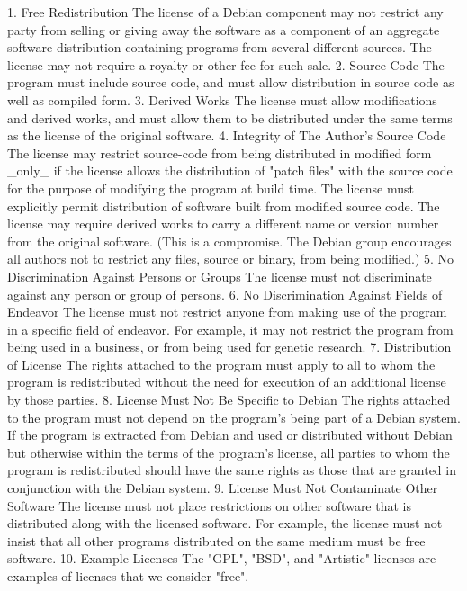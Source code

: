 \documentclass[mingoth,a4paper]{jsarticle}
\begin{document}
{{{\begin{commandline}
    1. Free Redistribution
       The license of a Debian component may not restrict any party from
       selling or giving away the software as a component of an aggregate
       software distribution containing programs from several different
       sources. The license may not require a royalty or other fee for
       such sale.
    2. Source Code
       The program must include source code, and must allow distribution
       in source code as well as compiled form.
    3. Derived Works
       The license must allow modifications and derived works, and must
       allow them to be distributed under the same terms as the license
       of the original software.
    4. Integrity of The Author's Source Code
       The license may restrict source-code from being distributed in
       modified form _only_ if the license allows the distribution of
       "patch files" with the source code for the purpose of modifying
       the program at build time. The license must explicitly permit
       distribution of software built from modified source code. The
       license may require derived works to carry a different name or
       version number from the original software. (This is a compromise.
       The Debian group encourages all authors not to restrict any files,
       source or binary, from being modified.)
    5. No Discrimination Against Persons or Groups
       The license must not discriminate against any person or group of
       persons.
    6. No Discrimination Against Fields of Endeavor
       The license must not restrict anyone from making use of the
       program in a specific field of endeavor. For example, it may not
       restrict the program from being used in a business, or from being
       used for genetic research.
    7. Distribution of License
       The rights attached to the program must apply to all to whom the
       program is redistributed without the need for execution of an
       additional license by those parties.
    8. License Must Not Be Specific to Debian
       The rights attached to the program must not depend on the
       program's being part of a Debian system. If the program is
       extracted from Debian and used or distributed without Debian but
       otherwise within the terms of the program's license, all parties
       to whom the program is redistributed should have the same rights
       as those that are granted in conjunction with the Debian system.
    9. License Must Not Contaminate Other Software
       The license must not place restrictions on other software that is
       distributed along with the licensed software. For example, the
       license must not insist that all other programs distributed on the
       same medium must be free software.
   10. Example Licenses
       The "GPL", "BSD", and "Artistic" licenses are examples of licenses
       that we consider "free".


\end{commandline}}}}
\end{document}
